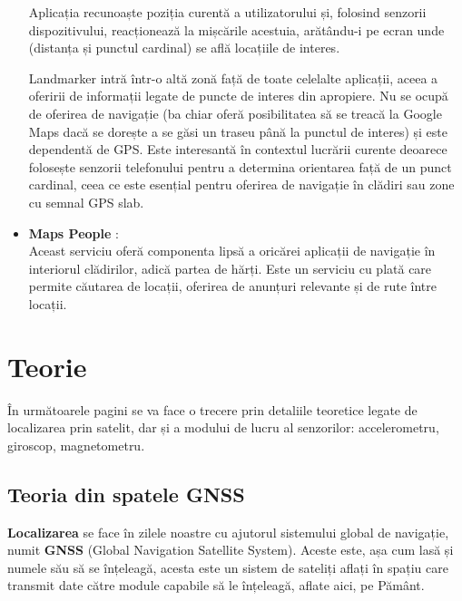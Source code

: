 \documentclass[12pt, a4paper, oneside]{article}
\begin{document}
\begin{itemize}
Aplicația recunoaște poziția curentă a utilizatorului și, folosind senzorii dispozitivului, reacționează la mișcările acestuia, arătându-i pe ecran unde (distanța și punctul cardinal) se află locațiile de interes.

Landmarker intră într-o altă zonă față de toate celelalte aplicații, aceea a oferirii de informații legate de puncte de interes din apropiere. Nu se ocupă de oferirea de navigație (ba chiar oferă posibilitatea să se treacă la Google Maps dacă se dorește a se găsi un traseu până la punctul de interes) și este dependentă de GPS. Este interesantă în contextul lucrării curente deoarece folosește senzorii telefonului pentru a determina orientarea față de un punct cardinal, ceea ce este esențial pentru oferirea de navigație în clădiri sau zone cu semnal GPS slab.

\item \textbf{Maps People} \cite{MapsPeople}:\\
Aceast serviciu oferă componenta lipsă a oricărei aplicații de navigație în interiorul clădirilor, adică partea de hărți. Este un serviciu cu plată care permite căutarea de locații, oferirea de anunțuri relevante și de rute între locații.

\end{itemize}

\newpage



\section{Teorie} \label{Teorie}

În următoarele pagini se va face o trecere prin detaliile teoretice legate de localizarea prin satelit, dar și a modului de lucru al senzorilor: accelerometru, giroscop, magnetometru.

\subsection{Teoria din spatele GNSS}
\textbf{Localizarea} se face în zilele noastre cu ajutorul sistemului global de navigație, numit \textbf{GNSS} (Global Navigation Satellite System). Aceste este, așa cum lasă și numele său să se înțeleagă, acesta este un sistem de sateliți aflați în spațiu care transmit date către module capabile să le înțeleagă, aflate aici, pe Pământ.
\end{document}
